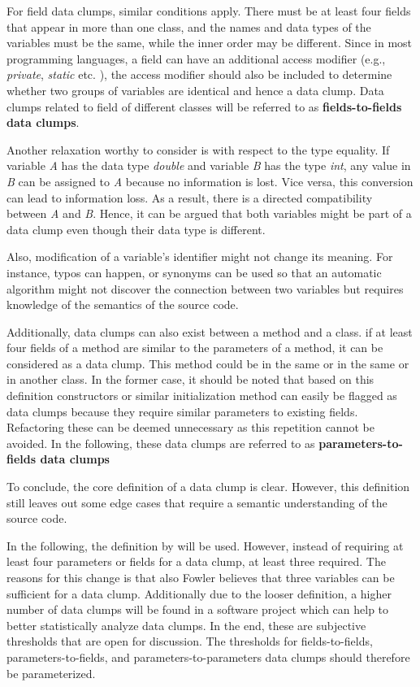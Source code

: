 For field data clumps, similar conditions apply. There must be at least four fields that appear in more than one class, and the names and data types of the variables must be the same, while the inner order may be different. Since in most programming languages, a field can have an additional access modifier (e.g., \textit{private}, \textit{static} etc. ), the access modifier should also be included to determine whether two groups of variables are identical and hence a data clump.  Data clumps related to field of different classes will be referred to as \textbf{fields-to-fields data clumps}.

Another relaxation worthy to consider is with respect to the type equality. If variable \textit{A} has the data type \textit{double} and variable \textit{B} has the type \textit{int}, any value in \textit{B} can be assigned to \textit{A} because no information is lost. Vice versa, this conversion can lead to information loss. As a result, there is a directed compatibility between \textit{A} and \textit{B}. Hence, it can be argued that both variables might be part of a data clump even though their data type is different. 


Also, modification of a variable's identifier might not change its meaning. For instance, typos can happen, or synonyms can be used so that an automatic algorithm might not discover the connection between two variables but requires knowledge of the semantics of the source code. \cite{zhangImprovingPrecisionFowler2008}

Additionally, data clumps can also exist between a method and a class. if at least four fields of a method are similar to the parameters of a method, it can be considered as a data clump. This method could be in the same or in the same or in another class. In the former case, it should be noted that based on this definition constructors or similar initialization method can easily be flagged as data clumps because they require similar parameters to existing fields. Refactoring these can be deemed unnecessary as this repetition cannot be avoided. 
 In the following, these data clumps are referred to as \textbf{parameters-to-fields data clumps}

To conclude, the core definition of a data clump is clear. However, this definition still leaves out some edge cases that require a semantic understanding of the source code. 



In the following, the definition by \cite{zhangImprovingPrecisionFowler2008} will be used. However,  instead of requiring at least four parameters or fields for a data clump, at least three required. The reasons for this change is that also Fowler believes that three variables can be sufficient for a data clump. Additionally due to the looser definition, a higher number of data clumps will be found in a software project which can help to better statistically analyze data clumps. In the end, these are subjective thresholds that are open for discussion. The thresholds for fields-to-fields, parameters-to-fields, and parameters-to-parameters data clumps should therefore be parameterized.



